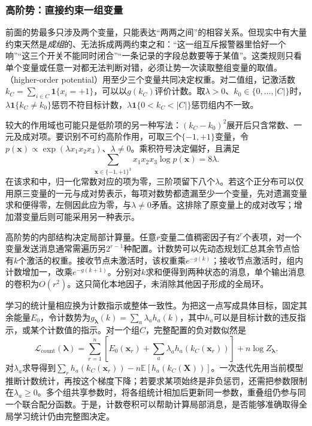 \subsubsection{高阶势：直接约束一组变量}
\label{sec:pgm-energy-models-higher-relational}

前面的势最多只涉及两个变量，只能表达“两两之间”的相容关系。但现实中有大量约束天然是\emph{成组}的、无法拆成两两约束之和：“这一组互斥报警器里恰好一个响”“这三个开关不能同时闭合”“一条记录的字段总数要等于某值”。这类规则只看单个变量或任意一对都无法判断对错，必须让势一次读取整组变量的取值。（higher-order potential）用至少三个变量共同决定权重。对二值组，记激活数$k_C=\sum_{i\in C}\mathbf{1}\{x_i=+1\}$，可以以$g(k_C)$评价计数。取$\lambda>0$、$k_0\in\{0,\ldots,|C|\}$时，$\lambda\mathbf{1}\{k_C\ne k_0\}$惩罚不符目标计数，$\lambda\mathbf{1}\{0<k_C<|C|\}$惩罚组内不一致。

较大的作用域也可能只是低阶项的另一种写法：$(k_C-k_0)^2$展开后只含常数、一元及成对项。要识别不可约高阶作用，可取三个$\{-1,+1\}$变量，令$p(\bm{x})\propto\exp(\lambda x_1x_2x_3)$、$\lambda\ne0$。乘积符号决定偏好，且满足
\[
  \sum_{\bm{x}\in\{-1,+1\}^3}
     x_1x_2x_3\log p(\bm{x})=8\lambda.
\]
在该求和中，归一化常数对应的项为零，三阶项留下八个$\lambda$。若这个正分布可以仅用原三变量的一元与成对势表示，每项对数势都遗漏至少一个变量，先对遗漏变量求和便得零，左侧因此应为零，与$\lambda\ne0$矛盾。这排除了原变量上的成对改写；增加潜变量后则可能采用另一种表示。

高阶势的内部结构决定局部计算量。任意$r$变量二值稠密因子有$2^r$个表项，对一个变量发送消息通常需遍历另$2^{r-1}$种配置。计数势可以先动态规划汇总其余节点恰有$k$个激活的权重。接收节点未激活时，该权重乘$e^{-g(k)}$；接收节点激活时，组内计数增加一，改乘$e^{-g(k+1)}$。分别对$k$求和便得到两种状态的消息，单个输出消息的卷积为$O(r^2)$。这只简化本地因子，未消除其他因子形成的全局环。

学习的统计量相应换为计数指示或整体一致性。为把这一点写成具体目标，固定其余能量$E_0$，令计数势为$g_{\bm{\lambda}}(k)=\sum_a\lambda_a h_a(k)$，其中$h_a$可以是目标计数的违反指示，或某个计数值的指示。对一个组$C$，完整配置的负对数似然是
\[
  \mathcal{L}_{\mathrm{count}}(\bm{\lambda})
   =\sum_{r=1}^n\left[
       E_0(\bm{x}_r)+\sum_a\lambda_a h_a(k_C(\bm{x}_r))\right]
       +n\log Z_{\bm{\lambda}}.
\]
对$\lambda_a$求导得到$\sum_rh_a(k_C(\bm{x}_r))-n\mathbb{E}[h_a(k_C(\bm{X}))]$。一次迭代先用当前模型推断计数统计，再按这个梯度下降；若要求某项始终是非负惩罚，还需把参数限制在$\lambda_a\geq0$。多个组共享参数时，将各组统计相加后更新同一参数，重叠组仍参与同一个联合配分函数。于是，计数卷积可以帮助计算局部消息，是否能够准确取得全局学习统计仍由完整图决定。

